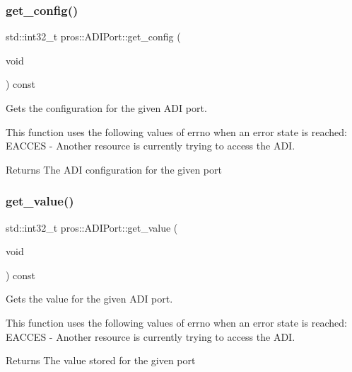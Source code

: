 \subsubsection{\texorpdfstring{get\_config()}{get\_config()}}
{\footnotesize\ttfamily std\+::int32\+\_\+t pros\+::\+A\+D\+I\+Port\+::get\+\_\+config (\begin{DoxyParamCaption}\item[{void}]{ }\end{DoxyParamCaption}) const}



Gets the configuration for the given A\+DI port. 

This function uses the following values of errno when an error state is reached\+: E\+A\+C\+C\+ES -\/ Another resource is currently trying to access the A\+DI.

\begin{DoxyReturn}{Returns}
The A\+DI configuration for the given port 
\end{DoxyReturn}
\mbox{\label{classpros_1_1ADIPort_ac79b5fd3ce67ae6ffc4b1fbbb306e997}} 
\subsubsection{\texorpdfstring{get\_value()}{get\_value()}}
{\footnotesize\ttfamily std\+::int32\+\_\+t pros\+::\+A\+D\+I\+Port\+::get\+\_\+value (\begin{DoxyParamCaption}\item[{void}]{ }\end{DoxyParamCaption}) const}



Gets the value for the given A\+DI port. 

This function uses the following values of errno when an error state is reached\+: E\+A\+C\+C\+ES -\/ Another resource is currently trying to access the A\+DI.

\begin{DoxyReturn}{Returns}
The value stored for the given port 
\end{DoxyReturn}
\mbox{\label{classpros_1_1ADIPort_abd86653eebbc34b863ace81839f7e40c}} 
